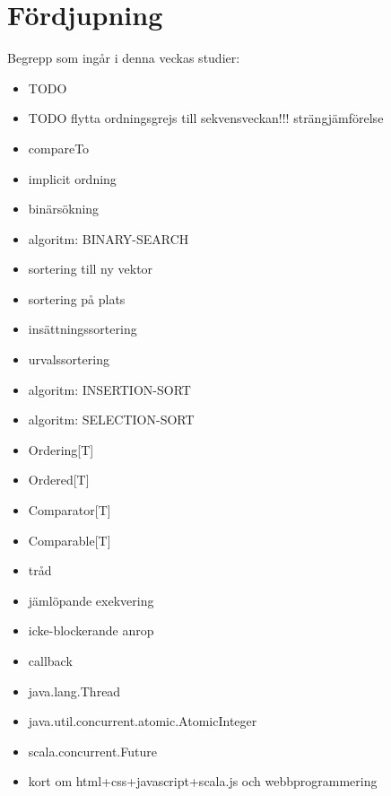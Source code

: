 \chapter{Fördjupning}\label{chapter:W12}
Begrepp som ingår i denna veckas studier:
\begin{itemize}[noitemsep,label={$\square$},leftmargin=*]
\item TODO
\item TODO flytta ordningsgrejs till sekvensveckan!!! strängjämförelse
\item compareTo
\item implicit ordning
\item binärsökning
\item algoritm: BINARY-SEARCH
\item sortering till ny vektor
\item sortering på plats
\item insättningssortering
\item urvalssortering
\item algoritm: INSERTION-SORT
\item algoritm: SELECTION-SORT
\item Ordering[T]
\item Ordered[T]
\item Comparator[T]
\item Comparable[T]
\item tråd
\item jämlöpande exekvering
\item icke-blockerande anrop
\item callback
\item java.lang.Thread
\item java.util.concurrent.atomic.AtomicInteger
\item scala.concurrent.Future
\item kort om html+css+javascript+scala.js och webbprogrammering\end{itemize}
